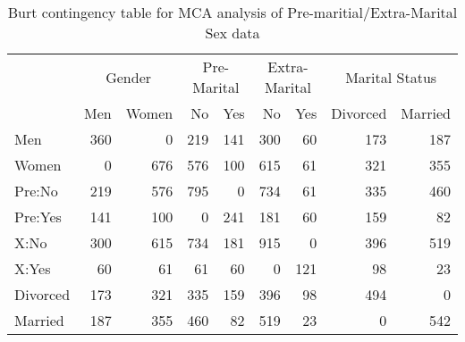 %
\begin{table}[htb]
 \caption{Burt contingency table for MCA analysis of Pre-maritial/Extra-Marital Sex data}
 \label{tab:victims}
 \begin{center}
\begin{tabular}{|l|rr|rr|rr|rr|}
  \hline
   &       \multicolumn{2}{c|}{Gender} & \multicolumn{2}{c|}{Pre-Marital} &\multicolumn{2}{c|}{Extra-Marital} & \multicolumn{2}{c|}{Marital Status} \\
   &           Men   &   Women &  No     &     Yes &  No   & Yes  &{\small Divorced} & {\small  Married} \\ \hline
%
Men        &   360   &     0   &   219   &   141   &   300   &    60   &   173   &   187 \\
Women      &     0   &   676   &   576   &   100   &   615   &    61   &   321   &   355 \\ \hline
Pre:No     &   219   &   576   &   795   &     0   &   734   &    61   &   335   &   460 \\
Pre:Yes    &   141   &   100   &     0   &   241   &   181   &    60   &   159   &    82 \\ \hline
X:No       &   300   &   615   &   734   &   181   &   915   &     0   &   396   &   519 \\
X:Yes      &    60   &    61   &    61   &    60   &     0   &   121   &    98   &    23 \\ \hline
Divorced   &   173   &   321   &   335   &   159   &   396   &    98   &   494   &     0 \\
Married    &   187   &   355   &   460   &    82   &   519   &    23   &     0   &   542 \\ \hline
\end{tabular}
\end{center}
\end{table}